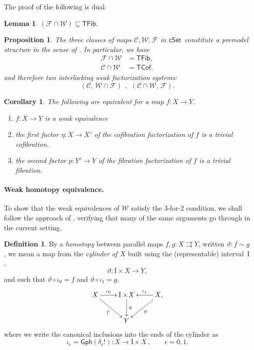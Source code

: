 \documentclass[12pt]{article}
\newcommand{\cSet}{\ensuremath{\mathsf{cSet}}}
\newcommand{\ra}{\ensuremath{\rightarrow}}
\renewcommand{\to}{\ensuremath{\rightarrow}}
\newcommand{\I}{\ensuremath{\mathrm{I}}}
\newtheorem{proposition}[theorem]{Proposition}
\newtheorem{lemma}[theorem]{Lemma}
\newtheorem{corollary}[theorem]{Corollary}
\theoremstyle{remark}
\theoremstyle{definition}
\newtheorem{definition}[theorem]{Definition}
\begin{document}
The proof of the following is dual:
\begin{lemma}
$(\mathcal{F} \cap \mathcal{W})  \subseteq \mathsf{TFib}.$
\end{lemma}

\begin{proposition}\label{prop:FWC}
The three classes of maps $\mathcal{C}, \mathcal{W}, \mathcal{F}$ in \cSet\ constitute a \emph{premodel structure} in the sense of \cite{Barton}.   In particular,  we have 
\begin{align*}
\mathcal{F}\cap\mathcal{W} &= \mathsf{TFib}, \\
\mathcal{C}\cap\mathcal{W} &= \mathsf{TCof},
\end{align*}
and therefore two interlocking weak factorization systems:
\[
(\mathcal{C},\, \mathcal{W}\cap\mathcal{F})\ \ ,\ \ (\mathcal{C}\cap\mathcal{W},\, \mathcal{F}).
\]
\end{proposition}

\begin{corollary}
The following are equivalent for a map $f: X\ra Y$.
\begin{enumerate}
\item $f:X\to Y$ is a weak equivalence
\item the first factor $\eta  : X \to X'$ of the cofibration factorization of $f$ is a trivial cofibration.
\item the second factor $p : Y' \to Y$ of the fibration factorization of $f$ is a trivial fibration.
\end{enumerate}
\end{corollary}

\paragraph{Weak homotopy equivalence.}

To show that the weak equivalences of $\mathcal{W}$ satisfy the 3-for-2 condition, we shall follow the approach of \cite{Joyal}, verifying that many of the same arguments go through in the current setting.

\begin{definition}\label{homotopy}
By a \emph{homotopy} between parallel maps $f, g: X\rightrightarrows Y$, written $\vartheta : f \sim g$,  we  mean a map from the \emph{cylinder of $X$} built using the (representable) interval~$\I$,
\[
\vartheta : \I\times{X} \ra Y,
\]
and such that $\vartheta \circ \iota_0 = f$ and $\vartheta \circ \iota_1 = g$, 
\begin{equation*}%
\xymatrix{
X \ar[r]^-{\iota_0} \ar[rd]_f & \I\times\!{X} \ar[d]^-{\vartheta} & X, \ar[l]_-{\iota_1} \ar[ld]^g \\
& Y &
}
\end{equation*}
where we write the canonical inclusions into the ends of the cylinder as
\[
\iota_\epsilon = \mathsf{Gph}(\delta_\epsilon!) : X\ra \I\times X\,,\qquad \epsilon = 0,1 .
\]  
\end{definition}
\end{document}
